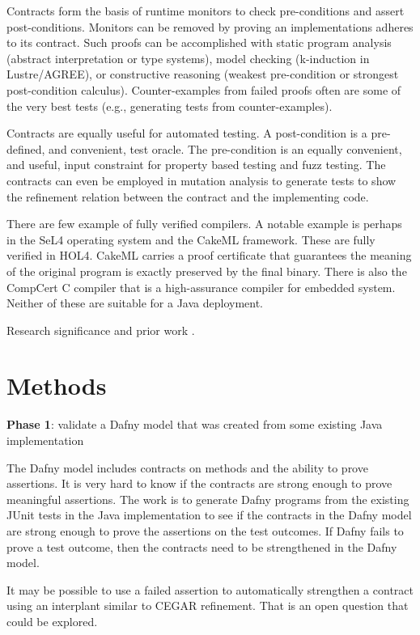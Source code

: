 \documentclass[11pt,onecolumn,notitlepage]{article}
\begin{document}
Contracts form the basis of runtime monitors to check pre-conditions and assert post-conditions. Monitors can be removed by proving an implementations adheres to its contract. Such proofs can be accomplished with static program analysis (abstract interpretation or type systems), model checking (k-induction in Lustre/AGREE), or constructive reasoning (weakest pre-condition or strongest post-condition calculus). Counter-examples from failed proofs often are some of the very best tests (e.g., generating tests from counter-examples).

Contracts are equally useful for automated testing. A post-condition is a pre-defined, and convenient, test oracle. The pre-condition is an equally convenient, and useful, input constraint for property based testing and fuzz testing. The contracts can even be employed in mutation analysis to generate tests to show the refinement relation between the contract and the implementing code. 

There are few example of fully verified compilers. A notable example is perhaps in the SeL4 operating system and the CakeML framework. These are fully verified in HOL4. CakeML carries a proof certificate that guarantees the meaning of the original program is exactly preserved by the final binary. There is also the CompCert C compiler that is a high-assurance compiler for embedded system. Neither of these are suitable for a Java deployment.

Research significance and prior work \cite{8972014}.

\section*{Methods}

\noindent\textbf{Phase 1}: validate a Dafny model that was created from some existing Java implementation

The Dafny model includes contracts on methods and the ability to prove assertions. It is very hard to know if the contracts are strong enough to prove meaningful assertions. The work is to generate Dafny programs from the existing JUnit tests in the Java implementation to see if the contracts in the Dafny model are strong enough to prove the assertions on the test outcomes. If Dafny fails to prove a test outcome, then the contracts need to be strengthened in the Dafny model. 

It may be possible to use a failed assertion to automatically strengthen a contract using an interplant similar to CEGAR refinement. That is an open question that could be explored.
\end{document}
